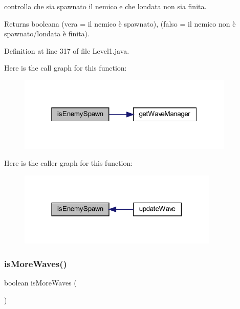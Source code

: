 controlla che sia spawnato il nemico e che l\textquotesingle{}ondata non sia finita. 

\begin{DoxyReturn}{Returns}
booleana (vera = il nemico è spawnato), (falso = il nemico non è spawnato/l\textquotesingle{}ondata è finita). 
\end{DoxyReturn}


Definition at line 317 of file Level1.\+java.

Here is the call graph for this function\+:\nopagebreak
\begin{figure}[H]
\begin{center}
\leavevmode
\includegraphics[width=292pt]{classscenes_1_1_level1_a121827ebd1c5b24c92f966721b51c0b9_cgraph}
\end{center}
\end{figure}
Here is the caller graph for this function\+:\nopagebreak
\begin{figure}[H]
\begin{center}
\leavevmode
\includegraphics[width=270pt]{classscenes_1_1_level1_a121827ebd1c5b24c92f966721b51c0b9_icgraph}
\end{center}
\end{figure}
\mbox{\label{classscenes_1_1_level1_a999f12a033f49f299ad7f55bcae24447}} 
\subsubsection{\texorpdfstring{is\+More\+Waves()}{isMoreWaves()}}
{\footnotesize\ttfamily boolean is\+More\+Waves (\begin{DoxyParamCaption}{ }\end{DoxyParamCaption})\hspace{0.3cm}{\ttfamily [private]}}



